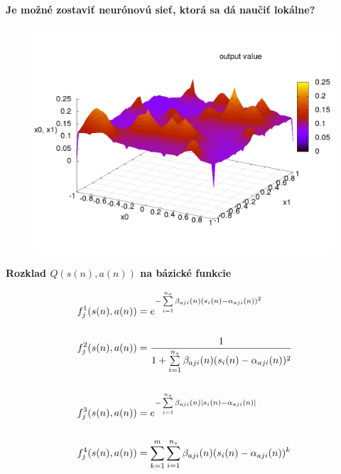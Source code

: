\documentclass[xcolor=dvipsnames]{beamer}
\begin{document}
\begin{frame}{\bf Je možné zostaviť neurónovú sieť, ktorá sa dá naučiť lokálne?}

\begin{figure}[!htb]
\includegraphics[scale=.35]{../pictures/gaussian.png}
\end{figure}

\end{frame}


\begin{frame}{\bf Rozklad $Q(s(n), a(n))$ na bázické funkcie}


\begin{align*}
    f_j^1(\boldmath{s(n), a(n)}) &= e^{ -\sum\limits_{i=1}^{n_s}{\beta_{aji}(n)(s_i(n) - \alpha_{aji}(n))^2} } \nonumber \\
    \\
    f_j^2(\boldmath{s(n), a(n)}) &= \frac{1}{1 + \sum\limits_{i=1}^{n_s}{\beta_{aji}(n)(s_i(n) - \alpha_{aji}(n))^2}} \nonumber \\
    \\
    f_j^3(\boldmath{s(n), a(n)}) &= e^{ -\sum\limits_{i=1}^{n_s}{\beta_{aji}(n)\mid s_i(n) - \alpha_{aji}(n) \mid} } \nonumber  \\
    \\
    f_j^4(\boldmath{s(n), a(n)}) &= \sum\limits_{k=1}^{m} \sum\limits_{i=1}^{n_s}{ \beta_{aji}(n)(s_i(n) - \alpha_{aji}(n))^k } \nonumber
\end{align*}

\end{frame}
\end{document}
